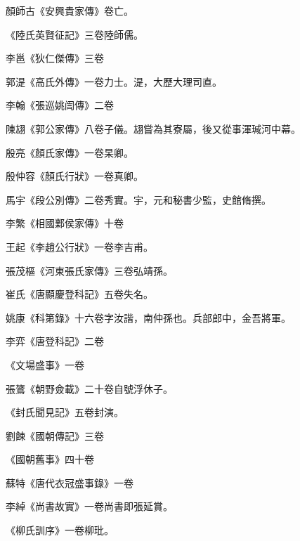 \begin{pinyinscope}
 顏師古《安興貴家傳》卷亡。



 《陸氏英賢征記》三卷陸師儒。



 李邕《狄仁傑傳》三卷



 郭湜《高氏外傳》一卷力士。湜，大歷大理司直。



 李翰《張巡姚訚傳》二卷



 陳翃《郭公家傳》八卷子儀。翃嘗為其寮屬，後又從事渾瑊河中幕。



 殷亮《顏氏家傳》一卷杲卿。



 殷仲容《顏氏行狀》一卷真卿。



 馬宇《段公別傳》二卷秀實。宇，元和秘書少監，史館脩撰。



 李繁《相國鄴侯家傳》十卷



 王起《李趙公行狀》一卷李吉甫。



 張茂樞《河東張氏家傳》三卷弘靖孫。



 崔氏《唐顯慶登科記》五卷失名。



 姚康《科第錄》十六卷字汝諧，南仲孫也。兵部郎中，金吾將軍。



 李弈《唐登科記》二卷



 《文場盛事》一卷



 張鷟《朝野僉載》二十卷自號浮休子。



 《封氏聞見記》五卷封演。



 劉餗《國朝傳記》三卷



 《國朝舊事》四十卷



 蘇特《唐代衣冠盛事錄》一卷



 李綽《尚書故實》一卷尚書即張延賞。



 《柳氏訓序》一卷柳玭。




\end{pinyinscope}
